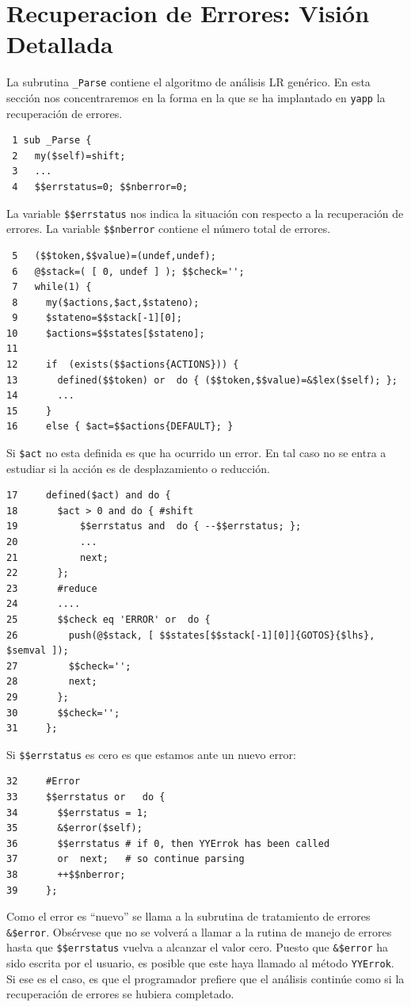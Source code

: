 \section{Recuperacion de Errores: Visión Detallada}
La subrutina \verb|_Parse| contiene el algoritmo de
análisis LR genérico. En esta sección 
nos concentraremos en la forma en la que se ha implantado en
\verb|yapp| la recuperación de errores.
\begin{verbatim}
 1 sub _Parse {
 2   my($self)=shift;
 3   ... 
 4   $$errstatus=0; $$nberror=0;
 \end{verbatim}
 La variable \verb|$$errstatus| nos indica la situación con respecto a la recuperación
 de errores. La variable \verb|$$nberror| contiene el número total de errores.
 \begin{verbatim}
 5   ($$token,$$value)=(undef,undef);
 6   @$stack=( [ 0, undef ] ); $$check='';
 7   while(1) {
 8     my($actions,$act,$stateno);
 9     $stateno=$$stack[-1][0];
10     $actions=$$states[$stateno];
11 
12     if  (exists($$actions{ACTIONS})) { 
13       defined($$token) or  do { ($$token,$$value)=&$lex($self); };
14       ...
15     }
16     else { $act=$$actions{DEFAULT}; }
\end{verbatim}
Si \verb|$act| no esta definida es que ha ocurrido un 
error. En tal caso no se entra a estudiar
si la acción es de desplazamiento o reducción.
\begin{verbatim}
17     defined($act) and do { 
18       $act > 0 and do { #shift
19           $$errstatus and  do { --$$errstatus; };
20           ...
21           next;
22       };
23       #reduce
24       ....
25       $$check eq 'ERROR' or  do {
26         push(@$stack, [ $$states[$$stack[-1][0]]{GOTOS}{$lhs}, $semval ]);
27         $$check='';
28         next;
29       };
30       $$check='';
31     };
\end{verbatim}
Si \verb|$$errstatus| es cero es que estamos
ante un nuevo error:
\begin{verbatim}
32     #Error
33     $$errstatus or   do {
34       $$errstatus = 1;
35       &$error($self);
36       $$errstatus # if 0, then YYErrok has been called
37       or  next;   # so continue parsing
38       ++$$nberror;
39     };
\end{verbatim}
Como el error es ``nuevo'' se llama a la subrutina de 
tratamiento de errores \verb|&$error|. Obsérvese que no
se volverá a llamar a la rutina de manejo de errores
hasta que \verb|$$errstatus| vuelva a alcanzar 
el valor cero. Puesto que \verb|&$error| ha sido
escrita por el usuario, es posible que este haya llamado
al método \verb|YYErrok|. Si ese es el caso, es que el
programador prefiere que el análisis continúe como
si la recuperación de errores se hubiera completado.


